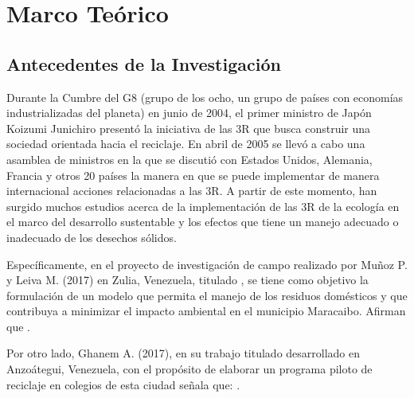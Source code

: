 \vspace*{6cm}
\chapter{Marco Teórico}
\newpage

\section{Antecedentes de la Investigación}

Durante la Cumbre del G8 (grupo de los ocho, un grupo de países con economías industrializadas del planeta) en junio de 2004, el primer ministro de Japón Koizumi Junichiro presentó la iniciativa de las 3R que busca construir una sociedad orientada hacia el reciclaje. En abril de 2005 se llevó a cabo una asamblea de ministros en la que se discutió con Estados Unidos, Alemania, Francia y otros 20 países la manera en que se puede implementar de manera internacional acciones relacionadas a las 3R. A partir de este momento, han surgido muchos estudios acerca de la implementación de las 3R de la ecología en el marco del desarrollo sustentable y los efectos que tiene un manejo adecuado o inadecuado de los desechos sólidos.

Específicamente, en el proyecto de investigación de campo realizado por Muñoz P. y Leiva M. (2017) en Zulia, Venezuela, titulado , se tiene como objetivo la formulación de un modelo que permita el manejo de los residuos domésticos y que contribuya a minimizar el impacto ambiental en el municipio Maracaibo. Afirman que .

Por otro lado, Ghanem A. (2017), en su trabajo titulado  desarrollado en Anzoátegui, Venezuela, con el propósito de elaborar un programa piloto de reciclaje en colegios de esta ciudad señala que: .

